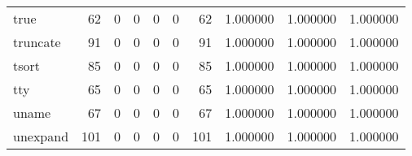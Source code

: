 \begin{longtable}{lrrrrrrrrr}
true      &                                    62 &                                                  0 &                                                  0 &                                                  0 &                                                  0 &                                                 62 &                                           1.000000 &                               1.000000 &                             1.000000 \\
truncate  &                                    91 &                                                  0 &                                                  0 &                                                  0 &                                                  0 &                                                 91 &                                           1.000000 &                               1.000000 &                             1.000000 \\
tsort     &                                    85 &                                                  0 &                                                  0 &                                                  0 &                                                  0 &                                                 85 &                                           1.000000 &                               1.000000 &                             1.000000 \\
tty       &                                    65 &                                                  0 &                                                  0 &                                                  0 &                                                  0 &                                                 65 &                                           1.000000 &                               1.000000 &                             1.000000 \\
uname     &                                    67 &                                                  0 &                                                  0 &                                                  0 &                                                  0 &                                                 67 &                                           1.000000 &                               1.000000 &                             1.000000 \\
unexpand  &                                   101 &                                                  0 &                                                  0 &                                                  0 &                                                  0 &                                                101 &                                           1.000000 &                               1.000000 &                             1.000000 \\

\end{longtable}
